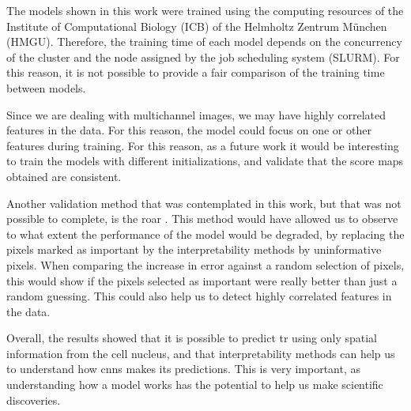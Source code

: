 
\glsresetall
\graphicspath{{./Sections/Results/Resources/}}

The models shown in this work were trained using the computing resources of the Institute of Computational Biology (ICB) of the Helmholtz Zentrum München (HMGU). Therefore, the training time of each model depends on the concurrency of the cluster and the node assigned by the job scheduling system (SLURM). For this reason, it is not possible to provide a fair comparison of the training time between models.

Since we are dealing with multichannel images, we may have highly correlated features in the data. For this reason, the model could focus on one or other features during training. For this reason, as a future work it would be interesting to train the models with different initializations, and validate that the score maps obtained are consistent.

Another validation method that was contemplated in this work, but that was not possible to complete, is the \gls{roar} \cite{hooker2018benchmark}. This method would have allowed us to observe to what extent the performance of the model would be degraded, by replacing the pixels marked as important by the interpretability methods by uninformative pixels. When comparing the increase in error against a random selection of pixels, this would show if the pixels selected as important were really better than just a random guessing. This could also help us to detect highly correlated features in the data.

Overall, the results showed that it is possible to predict \gls{tr} using only spatial information from the cell nucleus, and that interpretability methods can help us to understand how \glspl{cnn} makes its predictions. This is very important, as understanding how a model works has the potential to help us make scientific discoveries.

